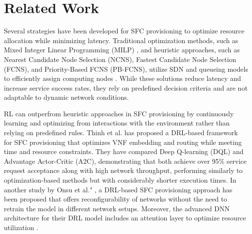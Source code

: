 \section{Related Work}
Several strategies have been developed for SFC provisioning to optimize resource allocation while minimizing latency. Traditional optimization methods, such as Mixed Integer Linear Programming (MILP) \cite{pham020}, and heuristic approaches, such as Nearest Candidate Node Selection (NCNS)\cite{atinafu2024}, Fastest Candidate Node Selection (FCNS)\cite{atinafu2024}, and Priority-Based FCNS (PB-FCNS)\cite{atinafu2024}, utilize SDN and queueing models to efficiently assign computing nodes \cite{atinafu2024}. While these solutions reduce latency and increase service success rates, they rely on predefined decision criteria and are not adaptable to dynamic network conditions. 

RL can outperfrom heuristic approaches in SFC provisioning by continuously learning and optimizing from interactions with the environment rather than relying on predefined rules.
Thinh et al. \cite{tran2024} has proposed a DRL-based framework for SFC provisioning that optimizes VNF embedding and routing while meeting time and resource constraints. They have compared Deep Q-learning (DQL) and Advantage Actor-Critic (A2C), demonstrating that both achieve over 95\% service request acceptance along with high network throughput, performing similarly to optimization-based methods but with considerably shorter execution times. 
In another study  by Onsu et al." \cite{arda24}, a DRL-based SFC provisioning approach has been proposed that offers reconfigurability of networks without the need to retrain the model in different network setups. Moreover, the advanced DNN architecture for their DRL model includes an attention layer to optimize resource utilization \cite{arda24}. 



